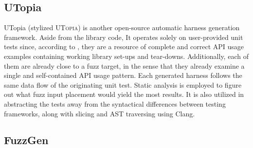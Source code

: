 \documentclass[
  a4paper,
]{scrreprt}
\theoremstyle{definition}
\theoremstyle{remark}
\begin{document}
\subsection{UTopia}\label{utopia}

UTopia \autocite{utopia} (stylized \textsc{UTopia}) is another
open-source automatic harness generation framework. Aside from the
library code, It operates solely on user-provided unit tests since,
according to \textcite{utopia}, they are a resource of complete and
correct API usage examples containing working library set-ups and
tear-downs. Additionally, each of them are already close to a fuzz
target, in the sense that they already examine a single and
self-contained API usage pattern. Each generated harness follows the
same data flow of the originating unit test. Static analysis is employed
to figure out what fuzz input placement would yield the most results. It
is also utilized in abstracting the tests away from the syntactical
differences between testing frameworks, along with slicing and AST
traversing using Clang.

\subsection{FuzzGen}\label{fuzzgen}
\end{document}
